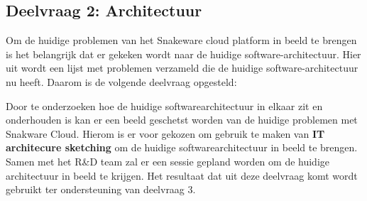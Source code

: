 \subsection{Deelvraag 2: Architectuur}
Om de huidige problemen van het Snakeware cloud platform in beeld te brengen is het belangrijk dat er gekeken wordt naar de huidige software-architectuur.
Hier uit wordt een lijst met problemen verzameld die de huidige software-architectuur nu heeft.
Daarom is de volgende deelvraag opgesteld:

\begin{center}
	\textit{\SubquestionTwo}
\end{center}

\whitespace[0.2]
Door te onderzoeken hoe de huidige softwarearchitectuur in elkaar zit en onderhouden is kan er een beeld geschetst worden van de huidige problemen met Snakware Cloud.
Hierom is er voor gekozen om gebruik te maken van \textbf{IT architecure sketching} om de huidige softwarearchitectuur in beeld te brengen.
Samen met het R\&D team zal er een sessie gepland worden om de huidige architectuur in beeld te krijgen.
Het resultaat dat uit deze deelvraag komt wordt gebruikt ter ondersteuning van deelvraag 3.

